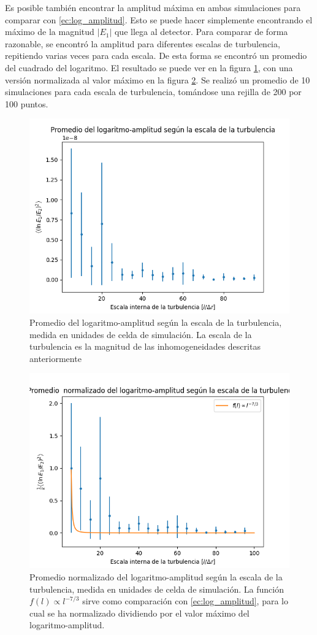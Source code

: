 Es posible también encontrar la amplitud máxima en ambas simulaciones para comparar con \ref{ec:log_amplitud}. Esto se puede hacer simplemente encontrando el máximo de la magnitud $|E_1|$ que llega al detector. Para comparar de forma razonable, se encontró la amplitud para diferentes escalas de turbulencia, repitiendo varias veces para cada escala. De esta forma se encontró un promedio del cuadrado del logaritmo. El resultado se puede ver en la figura \ref{fig:log_amlitude1}, con una versión normalizada al valor máximo en la figura \ref{fig:log_amlitude2}. Se realizó un promedio de 10 simulaciones para cada escala de turbulencia, tomándose una rejilla de 200 por 100 puntos.

\begin{figure}
    \centering
    \includegraphics[width=0.7\linewidth]{figures/log-amplitude.png}
    \caption{Promedio del logaritmo-amplitud según la escala de la turbulencia, medida en unidades de celda de simulación. La escala de la turbulencia es la magnitud de las inhomogeneidades descritas anteriormente}
    \label{fig:log_amlitude1}
\end{figure}

\begin{figure}
    \centering
    \includegraphics[width=0.7\linewidth]{figures/log-amplitude_good.png}
    \caption{Promedio normalizado del logaritmo-amplitud según la escala de la turbulencia, medida en unidades de celda de simulación. La función $f(l) \propto l^{-7/3}$ sirve como comparación con \ref{ec:log_amplitud}, para lo cual se ha normalizado dividiendo por el valor máximo del logaritmo-amplitud. }
    \label{fig:log_amlitude2}
\end{figure}

